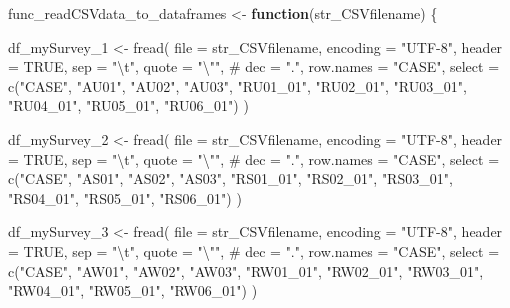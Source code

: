 \documentclass[
]{article}
\newenvironment{Shaded}{\begin{snugshade}}{\end{snugshade}}
\newcommand{\AttributeTok}[1]{\textcolor[rgb]{0.00,0.34,0.68}{#1}}
\newcommand{\CommentTok}[1]{\textcolor[rgb]{0.54,0.53,0.53}{#1}}
\newcommand{\ConstantTok}[1]{\textcolor[rgb]{0.67,0.33,0.00}{#1}}
\newcommand{\ControlFlowTok}[1]{\textcolor[rgb]{0.12,0.11,0.11}{\textbf{#1}}}
\newcommand{\FunctionTok}[1]{\textcolor[rgb]{0.39,0.29,0.61}{#1}}
\newcommand{\NormalTok}[1]{\textcolor[rgb]{0.12,0.11,0.11}{#1}}
\newcommand{\OtherTok}[1]{\textcolor[rgb]{0.00,0.43,0.16}{#1}}
\newcommand{\SpecialCharTok}[1]{\textcolor[rgb]{0.24,0.68,0.91}{#1}}
\newcommand{\StringTok}[1]{\textcolor[rgb]{0.75,0.01,0.01}{#1}}
\begin{document}
\begin{Shaded}
\begin{Highlighting}[]
\NormalTok{func\_readCSVdata\_to\_dataframes }\OtherTok{\textless{}{-}} \ControlFlowTok{function}\NormalTok{(str\_CSVfilename) \{}
  
\NormalTok{  df\_mySurvey\_1 }\OtherTok{\textless{}{-}} \FunctionTok{fread}\NormalTok{(}
    \AttributeTok{file =}\NormalTok{ str\_CSVfilename, }\AttributeTok{encoding =} \StringTok{"UTF{-}8"}\NormalTok{,}
    \AttributeTok{header =} \ConstantTok{TRUE}\NormalTok{, }\AttributeTok{sep =} \StringTok{"}\SpecialCharTok{\textbackslash{}t}\StringTok{"}\NormalTok{, }\AttributeTok{quote =} \StringTok{"}\SpecialCharTok{\textbackslash{}"}\StringTok{"}\NormalTok{,}
    \CommentTok{\# dec = ".", row.names = "CASE",}
    \AttributeTok{select =} \FunctionTok{c}\NormalTok{(}\StringTok{"CASE"}\NormalTok{, }\StringTok{"AU01"}\NormalTok{, }\StringTok{"AU02"}\NormalTok{, }\StringTok{"AU03"}\NormalTok{, }
               \StringTok{"RU01\_01"}\NormalTok{, }\StringTok{"RU02\_01"}\NormalTok{, }\StringTok{"RU03\_01"}\NormalTok{, }\StringTok{"RU04\_01"}\NormalTok{, }\StringTok{"RU05\_01"}\NormalTok{, }\StringTok{"RU06\_01"}\NormalTok{)}
\NormalTok{    )}
  
\NormalTok{  df\_mySurvey\_2 }\OtherTok{\textless{}{-}} \FunctionTok{fread}\NormalTok{(}
    \AttributeTok{file =}\NormalTok{ str\_CSVfilename, }\AttributeTok{encoding =} \StringTok{"UTF{-}8"}\NormalTok{,}
    \AttributeTok{header =} \ConstantTok{TRUE}\NormalTok{, }\AttributeTok{sep =} \StringTok{"}\SpecialCharTok{\textbackslash{}t}\StringTok{"}\NormalTok{, }\AttributeTok{quote =} \StringTok{"}\SpecialCharTok{\textbackslash{}"}\StringTok{"}\NormalTok{,}
    \CommentTok{\# dec = ".", row.names = "CASE",}
    \AttributeTok{select =} \FunctionTok{c}\NormalTok{(}\StringTok{"CASE"}\NormalTok{, }\StringTok{"AS01"}\NormalTok{, }\StringTok{"AS02"}\NormalTok{, }\StringTok{"AS03"}\NormalTok{, }
               \StringTok{"RS01\_01"}\NormalTok{, }\StringTok{"RS02\_01"}\NormalTok{, }\StringTok{"RS03\_01"}\NormalTok{, }\StringTok{"RS04\_01"}\NormalTok{, }\StringTok{"RS05\_01"}\NormalTok{, }\StringTok{"RS06\_01"}\NormalTok{)}
\NormalTok{    )}
  
\NormalTok{  df\_mySurvey\_3 }\OtherTok{\textless{}{-}} \FunctionTok{fread}\NormalTok{(}
    \AttributeTok{file =}\NormalTok{ str\_CSVfilename, }\AttributeTok{encoding =} \StringTok{"UTF{-}8"}\NormalTok{,}
    \AttributeTok{header =} \ConstantTok{TRUE}\NormalTok{, }\AttributeTok{sep =} \StringTok{"}\SpecialCharTok{\textbackslash{}t}\StringTok{"}\NormalTok{, }\AttributeTok{quote =} \StringTok{"}\SpecialCharTok{\textbackslash{}"}\StringTok{"}\NormalTok{,}
    \CommentTok{\# dec = ".", row.names = "CASE",}
    \AttributeTok{select =} \FunctionTok{c}\NormalTok{(}\StringTok{"CASE"}\NormalTok{, }\StringTok{"AW01"}\NormalTok{, }\StringTok{"AW02"}\NormalTok{, }\StringTok{"AW03"}\NormalTok{, }
               \StringTok{"RW01\_01"}\NormalTok{, }\StringTok{"RW02\_01"}\NormalTok{, }\StringTok{"RW03\_01"}\NormalTok{, }\StringTok{"RW04\_01"}\NormalTok{, }\StringTok{"RW05\_01"}\NormalTok{, }\StringTok{"RW06\_01"}\NormalTok{)}
\NormalTok{    )}
  

\end{Highlighting}
\end{Shaded}
\end{document}
